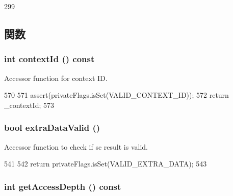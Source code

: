 \begin{DoxyCode}
299 {}
\end{DoxyCode}


\subsection{関数}
\hypertarget{classRequest_a651d5d14e7a4e95ebe6d7f5b8ee5a107}{
\subsubsection[{contextId}]{\setlength{\rightskip}{0pt plus 5cm}int contextId () const}}
\label{classRequest_a651d5d14e7a4e95ebe6d7f5b8ee5a107}
Accessor function for context ID. 


\begin{DoxyCode}
570     {
571         assert(privateFlags.isSet(VALID_CONTEXT_ID));
572         return _contextId;
573     }
\end{DoxyCode}
\hypertarget{classRequest_a6ef1621224aaaeb6f49afe60522f48ab}{
\subsubsection[{extraDataValid}]{\setlength{\rightskip}{0pt plus 5cm}bool extraDataValid ()}}
\label{classRequest_a6ef1621224aaaeb6f49afe60522f48ab}
Accessor function to check if sc result is valid. 


\begin{DoxyCode}
541     {
542         return privateFlags.isSet(VALID_EXTRA_DATA);
543     }
\end{DoxyCode}
\hypertarget{classRequest_a70caa016418f07187ca33babab978614}{
\subsubsection[{getAccessDepth}]{\setlength{\rightskip}{0pt plus 5cm}int getAccessDepth () const}}
\label{classRequest_a70caa016418f07187ca33babab978614}



